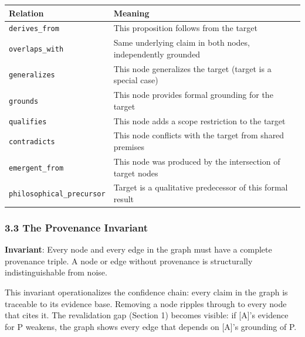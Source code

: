 \documentclass[
]{article}
\newcounter{none} %
\begin{document}
{\def\LTcaptype{none} %
\begin{longtable}[]{@{}
  >{\raggedright\arraybackslash}p{}
  >{\raggedright\arraybackslash}p{}@{}}
\toprule\noalign{}
\begin{minipage}[b]{\linewidth}\raggedright
Relation
\end{minipage} & \begin{minipage}[b]{\linewidth}\raggedright
Meaning
\end{minipage} \\
\midrule\noalign{}
\endhead
\bottomrule\noalign{}
\endlastfoot
\texttt{derives\_from} & This proposition follows from the target \\
\texttt{overlaps\_with} & Same underlying claim in both nodes,
independently grounded \\
\texttt{generalizes} & This node generalizes the target (target is a
special case) \\
\texttt{grounds} & This node provides formal grounding for the target \\
\texttt{qualifies} & This node adds a scope restriction to the target \\
\texttt{contradicts} & This node conflicts with the target from shared
premises \\
\texttt{emergent\_from} & This node was produced by the intersection of
target nodes \\
\texttt{philosophical\_precursor} & Target is a qualitative predecessor
of this formal result \\
\end{longtable}
}

\subsubsection{3.3 The Provenance
Invariant}\label{the-provenance-invariant}

\textbf{Invariant}: Every node and every edge in the graph must have a
complete provenance triple. A node or edge without provenance is
structurally indistinguishable from noise.

This invariant operationalizes the confidence chain: every claim in the
graph is traceable to its evidence base. Removing a node ripples through
to every node that cites it. The revalidation gap (Section 1) becomes
visible: if {[}A{]}'s evidence for P weakens, the graph shows every edge
that depends on {[}A{]}'s grounding of P.
\end{document}
